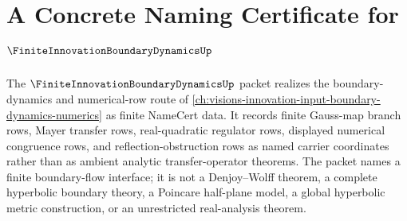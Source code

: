 \chapter{A Concrete Naming Certificate for $\FiniteInnovationBoundaryDynamicsUp$}
\label{ch:concrete-instances-finite-innovation-boundary-dynamics-namecert}

The $\FiniteInnovationBoundaryDynamicsUp$ packet realizes the boundary-dynamics and numerical-row route of \autoref{ch:visions-innovation-input-boundary-dynamics-numerics} as finite NameCert data. It records finite Gauss-map branch rows, Mayer transfer rows, real-quadratic regulator rows, displayed numerical congruence rows, and reflection-obstruction rows as named carrier coordinates rather than as ambient analytic transfer-operator theorems. The packet names a finite boundary-flow interface; it is not a Denjoy--Wolff theorem, a complete hyperbolic boundary theory, a Poincare half-plane model, a global hyperbolic metric construction, or an unrestricted real-analysis theorem.

